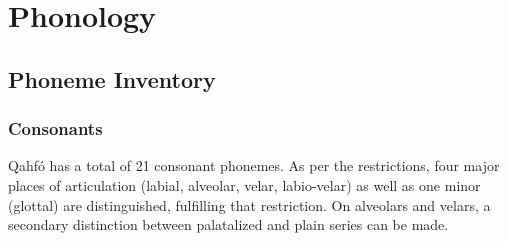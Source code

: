 \documentclass{article}
\newcommand{\langname}{Qahfó}
\begin{document}
\newpage
\section{Phonology}
\subsection{Phoneme Inventory}
\subsubsection{Consonants}
\langname{} has a total of 21 consonant phonemes. As per the restrictions, four major places of articulation (labial, alveolar, velar, labio-velar) as well as one minor (glottal) are distinguished, fulfilling that restriction. On alveolars and velars, a secondary distinction between palatalized and plain series can be made.
\end{document}
